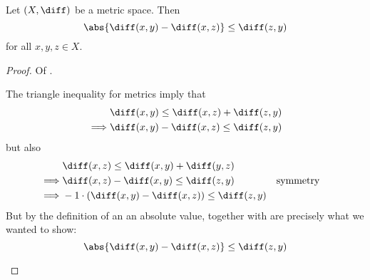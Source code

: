 \begin{thm}\label{thm-metric-inequality}
	Let $(X,\diff)$ be a metric space. Then
	\begin{equation}
		\abs{\diff(x,y)-\diff(x,z)}\leq\diff(z,y)
	\end{equation}
	for all $x,y,z\in X$.
\end{thm}

\begin{proof}
	Of .
	\begin{flushleft}
		The triangle inequality for metrics imply that
		\begin{align}
			 & \diff(x,y) \leq \diff(x,z) + \diff(z,y) \nonumber                      \\
			\implies
			 & \diff(x,y) - \diff(x,z) \leq \diff(z,y) \label{eq-metric-inequality:1}
		\end{align}
		but also
		\begin{align}
			 & \diff(x,z) \leq \diff(x,y) + \diff(y,z) \nonumber                                                               \\
			\implies
			 & \diff(x,z) - \diff(x,y) \leq \diff(z,y) \nonumber                                          &  & \text{symmetry} \\
			\implies
			 & -1\cdot\left(\diff(x,y) - \diff(x,z)\right) \leq \diff(z,y) \label{eq-metric-inequality:2}
		\end{align}
		But by the definition of an an absolute value, 
		together with  are precisely what
		we wanted to show:
		\begin{equation*}
			\abs{\diff(x,y) - \diff(x,z)} \leq \diff(z,y)
		\end{equation*}
	\end{flushleft}
\end{proof}

